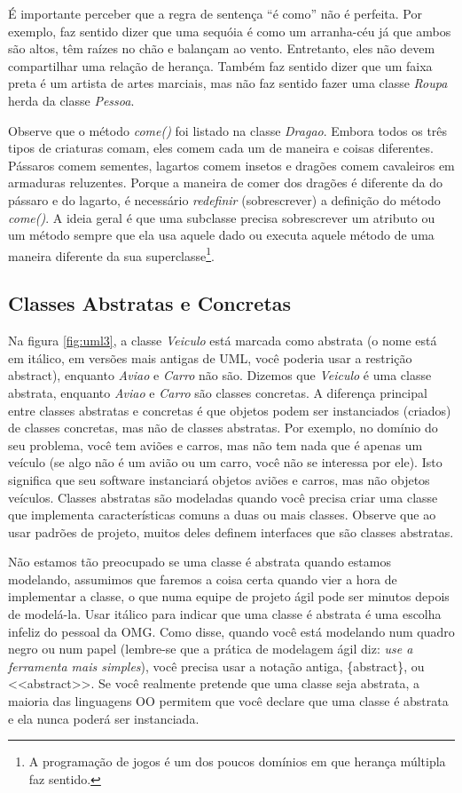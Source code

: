 É importante perceber que a regra de sentença ``é como'' não é perfeita. Por exemplo, faz sentido dizer que uma sequóia é como um arranha-céu já que ambos são altos, têm raízes no chão e balançam ao vento. Entretanto, eles não devem compartilhar uma relação de herança. Também faz sentido dizer que um faixa preta é um artista de artes marciais, mas não faz sentido fazer uma classe \emph{Roupa} herda da classe \emph{Pessoa}.

Observe que o método \emph{come()} foi listado na classe \emph{Dragao}. Embora todos os três tipos de criaturas comam, eles comem cada um de maneira e coisas diferentes. Pássaros comem sementes, lagartos comem insetos e dragões comem cavaleiros em armaduras reluzentes. Porque a maneira de comer dos dragões é diferente da do pássaro e do lagarto, é necessário \textit{redefinir} (sobrescrever) a definição do método \emph{come()}. A ideia geral é que uma subclasse precisa sobrescrever um atributo ou um método sempre que ela usa aquele dado ou executa aquele método de uma maneira diferente da sua superclasse\footnote{A programação de jogos é um dos poucos domínios em que herança múltipla faz sentido.}.

\subsection{Classes Abstratas e Concretas}

Na figura \ref{fig:uml3}, a classe \emph{Veiculo} está marcada como abstrata (o nome está em itálico, em versões mais antigas de UML, você poderia usar a restrição {abstract}), enquanto \emph{Aviao} e \emph{Carro} não são. Dizemos que 
\emph{Veiculo} é uma classe abstrata, enquanto \emph{Aviao} e \emph{Carro} são classes concretas. A diferença principal entre classes abstratas e concretas é que objetos podem ser instanciados (criados) de classes concretas, mas não de classes abstratas. Por exemplo, no domínio do seu problema, você tem aviões e carros, mas não tem nada que é apenas um veículo (se algo não é um avião ou um carro, você não se interessa por ele). Isto significa que seu software instanciará objetos aviões e carros, mas não objetos veículos. Classes abstratas são modeladas quando você precisa criar uma classe que implementa características comuns a duas ou mais classes. Observe que ao usar padrões de projeto, muitos deles definem interfaces que são classes abstratas.

Não estamos tão preocupado se uma classe é abstrata quando estamos modelando, assumimos que faremos a coisa certa quando vier a hora de implementar a classe, o que numa equipe de projeto ágil pode ser minutos depois de modelá-la. Usar itálico para indicar que uma classe é abstrata é uma escolha infeliz do pessoal da OMG. Como \cite{uml:destilado} disse, quando você está modelando num quadro negro ou num papel (lembre-se que a prática de modelagem ágil diz: \textit{use a ferramenta mais simples}), você precisa usar a notação antiga, \{abstract\}, ou <<abstract>>. Se você realmente pretende que uma classe seja abstrata, a maioria das linguagens OO permitem que você declare que uma classe é abstrata e ela nunca poderá ser instanciada.

